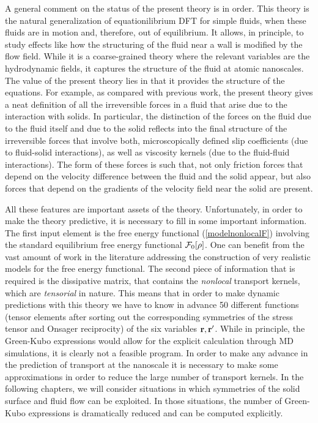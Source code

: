 \documentclass[b5paper,openright,10pt]{book}
\begin{document}
A  general comment  on the  status of the  present theory  is in
order.   This  theory is  the  natural  generalization of  equationilibrium
DFT for simple  fluids, when these fluids are in
motion and, therefore, out of equilibrium. It allows, in principle, to
study effects  like how the  structuring of the  fluid near a  wall is
modified by the flow field. While  it is a coarse-grained theory where
the relevant  variables are the  hydrodynamic fields, it  captures the
structure of the fluid at atomic nanoscales.  The value of the present
theory lies in  that it provides the structure of  the equations.  For
example, as  compared with previous  work, the present theory  gives a
neat definition of  all the irreversible forces in a  fluid that arise
due to the interaction with solids.  In particular, the distinction of
the forces on the  fluid due to the fluid itself and  due to the solid
reflects  into the  final structure  of the  irreversible forces  that
involve  both,  microscopically  defined  slip  coefficients  (due  to
fluid-solid interactions),  as well as  viscosity kernels (due  to the
fluid-fluid interactions).  The form of these forces is such that, not
only friction  forces that depend  on the velocity  difference between
the fluid  and the solid  appear, but also  forces that depend  on the
gradients of the velocity field near the solid are present.

All these features are important  assets of the theory. Unfortunately,
in order  to make the  theory predictive, it  is necessary to  fill in
some  important information.   The  first input  element  is the  free
energy  functional   (\ref{modelnonlocalF})  involving   the  standard
equilibrium  free  energy  functional  ${\cal  F}_0[\rho]$.   One  can
benefit from the vast amount of  work in the literature addressing the
construction   of  very   realistic   models  for   the  free   energy
functional. The  second piece of  information that is required  is the
dissipative  matrix, that  contains  the \textit{nonlocal}  transport
kernels, which are  \textit{tensorial} in nature.  This  means that in
order to make dynamic predictions with  this theory we have to know in
advance 50 different functions (tensor  elements after sorting out the
corresponding symmetries of the stress tensor and Onsager reciprocity)
of  the six  variables ${\bf  r},{\bf r}'$.   While in  principle, the
Green-Kubo  expressions  would  allow  for  the  explicit  calculation
through MD simulations, it is clearly not a feasible program. In order
to make any advance in the prediction of transport at the nanoscale it
is necessary to make some approximations  in order to reduce the large
number of transport  kernels.  In the following chapters,  we will consider situations
in  which symmetries  of  the  solid surface  and  fluid  flow can  be
exploited.  In those situations,  the number of Green-Kubo expressions
is dramatically reduced and can be computed explicitly.
\end{document}
